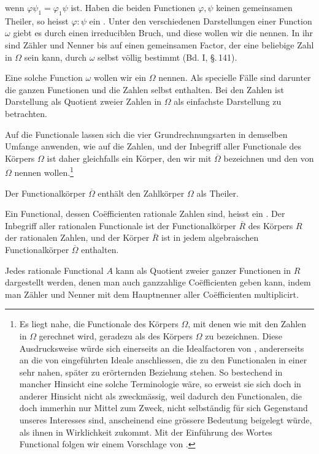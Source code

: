 wenn $\varphi\psi_1 = \varphi_1\psi$ ist. Haben die beiden Functionen $\varphi, \psi$ keinen gemeinsamen Theiler, so heisst $\varphi:\psi$ ein . Unter den verschiedenen Darstellungen einer Function $\omega$ giebt es  durch einen irreduciblen Bruch, und diese wollen wir die  nennen. In ihr sind Z\"ahler und Nenner bis auf einen gemeinsamen Factor, der eine beliebige Zahl in $\Omega$ sein kann, durch $\omega$ selbst v\"ollig bestimmt (Bd. I, \S.\,141).

Eine solche Function $\omega$ wollen wir ein  $\Omega$ nennen. Als specielle F\"alle sind darunter die ganzen Functionen und die Zahlen selbst enthalten. Bei den Zahlen ist  Darstellung als Quotient zweier Zahlen in $\Omega$ als einfachste Darstellung zu betrachten.

Auf die Functionale lassen sich die vier Grundrechnungsarten in demselben Umfange anwenden, wie auf die Zahlen, und der Inbegriff aller Functionale des K\"orpers $\Omega$ ist daher gleichfalls ein K\"orper, den wir mit $\overline{\Omega}$ bezeichnen und den  von $\Omega$ nennen wollen.\footnote{Es liegt nahe, die Functionale des K\"orpers $\Omega$, mit denen wie mit den Zahlen in $\Omega$ gerechnet wird, geradezu als  des K\"orpers $\Omega$ zu bezeichnen. Diese Ausdrucksweise w\"urde sich einerseits an die Idealfactoren von , andererseits an die von  eingef\"uhrten Ideale anschliessen, die zu den Functionalen in einer sehr nahen, sp\"ater zu er\"orternden Beziehung stehen. So bestechend in mancher Hinsicht eine solche Terminologie w\"are, so erweist sie sich doch in anderer Hinsicht nicht als zweckm\"assig, weil dadurch den Functionalen, die doch immerhin nur Mittel zum Zweck, nicht selbst\"andig f\"ur sich Gegenstand unseres Interesses sind, anscheinend eine gr\"ossere Bedeutung beigelegt w\"urde, als ihnen in Wirklichkeit zukommt. Mit der Einf\"uhrung des Wortes \glqq Functional\grqq{} folgen wir einem Vorschlage von .}

Der Functionalk\"orper $\overline{\Omega}$ enth\"alt den Zahlk\"orper $\Omega$ als Theiler.

Ein Functional, dessen Co\"efficienten rationale Zahlen sind, heisst ein . Der Inbegriff aller rationalen Functionale ist der Functionalk\"orper $\overline{R}$ des K\"orpers $R$ der rationalen Zahlen, und der K\"orper $\overline{R}$ ist in jedem algebraischen Functionalk\"orper $\overline{\Omega}$ enthalten.

Jedes rationale Functional $A$ kann als Quotient zweier ganzer Functionen in $R$ dargestellt werden, denen man auch ganzzahlige Co\"efficienten geben kann, indem man Z\"ahler und Nenner mit dem Hauptnenner aller Co\"efficienten multiplicirt.
